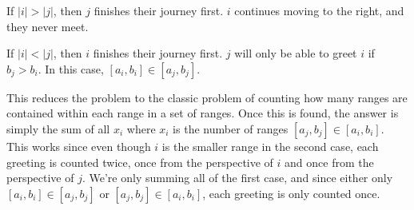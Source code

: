 \documentclass{article}
\begin{document}
If $|i|>|j|$, then $j$ finishes their journey first. $i$ continues moving to the right, and they never meet.

If $|i|<|j|$, then $i$ finishes their journey first. $j$ will only be able to greet $i$ if $b_j > b_i$. In this case, $[a_i, b_i] \in [a_j, b_j]$.

This reduces the problem to the classic problem of counting how many ranges are contained within each range in a set of ranges. Once this is found, the answer is simply the sum of all $x_i$ where $x_i$ is the number of ranges $[a_j, b_j] \in [a_i, b_i]$. This works since even though $i$ is the smaller range in the second case, each greeting is counted twice, once from the perspective of $i$ and once from the perspective of $j$. We're only summing all of the first case, and since either only $[a_i, b_i] \in [a_j, b_j]$ or $[a_j, b_j] \in [a_i, b_i]$, each greeting is only counted once.
\end{document}
